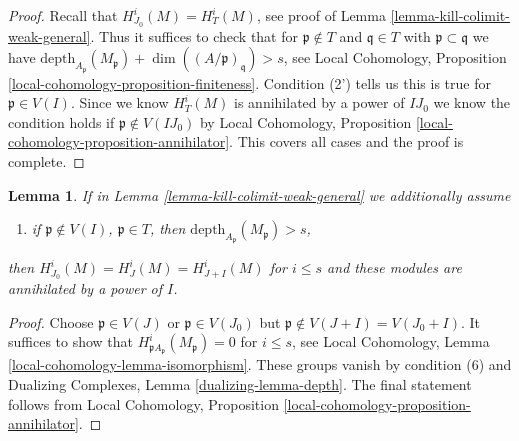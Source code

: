 \documentclass{stacks-project}
\theoremstyle{plain}
\newtheorem{lemma}[subsection]{Lemma}
\theoremstyle{definition}
\theoremstyle{remark}
\numberwithin{equation}{subsection}
\begin{document}
\begin{proof}
Recall that $H^i_{J_0}(M) = H^i_T(M)$, see proof of
Lemma \ref{lemma-kill-colimit-weak-general}. Thus it suffices to
check that for $\mathfrak p \not \in T$ and $\mathfrak q \in T$
with $\mathfrak p \subset \mathfrak q$ we have
$\text{depth}_{A_\mathfrak p}(M_\mathfrak p) +
\dim((A/\mathfrak p)_\mathfrak q) > s$, see Local Cohomology,
Proposition \ref{local-cohomology-proposition-finiteness}.
Condition (2') tells us this is true for $\mathfrak p \in V(I)$.
Since we know $H^i_T(M)$ is annihilated by a power of $IJ_0$
we know the condition holds if $\mathfrak p \not \in V(IJ_0)$
by Local Cohomology, Proposition \ref{local-cohomology-proposition-annihilator}.
This covers all cases and the proof is complete.
\end{proof}

\begin{lemma}
\label{lemma-kill-colimit-support-general}
If in Lemma \ref{lemma-kill-colimit-weak-general} we additionally assume
\begin{enumerate}
\item[(6)] if $\mathfrak p \not \in V(I)$, $\mathfrak p \in T$, then
$\text{depth}_{A_\mathfrak p}(M_\mathfrak p) > s$,
\end{enumerate}
then $H^i_{J_0}(M) = H^i_J(M) = H^i_{J + I}(M)$ for $i \leq s$ and these
modules are annihilated by a power of $I$.
\end{lemma}

\begin{proof}
Choose $\mathfrak p \in V(J)$ or $\mathfrak p \in V(J_0)$ but
$\mathfrak p \not \in V(J + I) = V(J_0 + I)$.
It suffices to show that $H^i_{\mathfrak pA_\mathfrak p}(M_\mathfrak p) = 0$
for $i \leq s$, see
Local Cohomology, Lemma \ref{local-cohomology-lemma-isomorphism}.
These groups vanish by condition (6) and
Dualizing Complexes, Lemma \ref{dualizing-lemma-depth}.
The final statement follows from
Local Cohomology, Proposition \ref{local-cohomology-proposition-annihilator}.
\end{proof}
\end{document}
